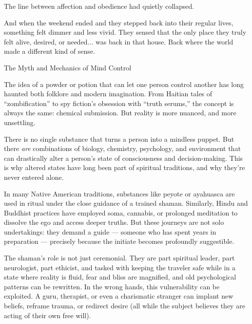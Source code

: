 The line between affection and obedience had quietly collapsed.

And when the weekend ended and they stepped back 
into their regular lives, something felt dimmer and less vivid. 
They sensed that the only place they truly felt alive, 
desired, or needed... was back in that house. 
Back where the world made a different kind of sense.

\medskip

\begin{PsychologicalSidebar}{The Myth and Mechanics of Mind Control}

  The idea of a powder or potion that can let one person control another has long haunted both folklore and modern 
  imagination. From Haitian tales of “zombification” to spy fiction's obsession with “truth serums,” the concept is 
  always the same: chemical submission. But reality is more nuanced, and more unsettling.

  \medskip
  
  There is no single substance that turns a person into a mindless puppet. But there \emph{are} combinations of biology, 
  chemistry, psychology, and environment that can drastically alter a person’s state of consciousness and decision-making. 
  This is why altered states have long been part of spiritual traditions, and why they’re never entered alone.

  \medskip
  
  In many Native American traditions, substances like peyote or ayahuasca are used in ritual under the close guidance of 
  a trained shaman. Similarly, Hindu and Buddhist practices have employed soma, cannabis, or prolonged meditation 
  to dissolve the ego and access deeper truths. But these journeys are not solo undertakings: they demand a guide — 
  someone who has spent years in preparation — precisely because the initiate becomes profoundly suggestible. 

  \medskip
  
  The shaman’s role is not just ceremonial. They are part spiritual leader, part neurologist, part ethicist, and tasked with 
  keeping the traveler safe while in a state where reality is fluid, fear and bliss are magnified, and old psychological 
  patterns can be rewritten. In the wrong hands, this vulnerability can be exploited. A guru, therapist, or even a 
  charismatic stranger can implant new beliefs, reframe trauma, or redirect desire (all while the subject believes they 
  are acting of their own free will).


\end{PsychologicalSidebar}

